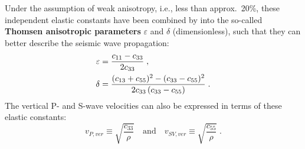 Under the assumption of weak anisotropy, i.e., less than approx.~20\%, these independent elastic constants have been combined by \citet{Thomsen:86} into the so-called \textbf{Thomsen anisotropic parameters} $\varepsilon$ and $\delta$ (dimensionless), such that they can better describe the seismic wave propagation:
\begin{subequations}
\allowdisplaybreaks
\begin{align}
    \varepsilon &= \frac{c_{11}-c_{33}}{2c_{33}}\;,\\
    \delta &= \frac{(c_{13}+c_{55})^2-(c_{33}-c_{55})^2}{2c_{33}\,(c_{33}-c_{55})}\;.
\end{align}
\end{subequations}
The vertical P- and S-wave velocities can also be expressed in terms of these elastic constants:
\begin{equation}
    v_{P,ver} \equiv \sqrt{\frac{c_{33}}{\rho}} \quad \textrm{and} \quad v_{SV,ver} \equiv \sqrt{\frac{c_{55}}{\rho}}\;.
    \label{eq:ver_vel}
\end{equation}


